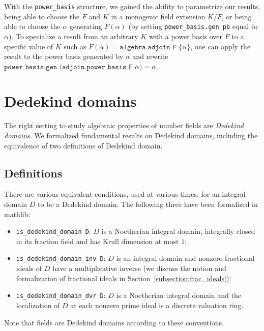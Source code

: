 \documentclass[a4paper,USenglish,cleveref, autoref, thm-restate]{lipics-v2021}
\newcommand{\lean}[1]{\texttt{#1}\xspace} %
\newcommand{\mathlib}{\textsf{mathlib}\xspace}
\begin{document}
With the \lean{power\_basis} structure, we gained the ability to parametrize our results,
being able to choose the $F$ and $K$ in a monogenic field extension $K / F$, or being able to choose the $\alpha$ generating $F(\alpha)$ (by setting \lean{power\_basis.gen\ pb} equal to $\alpha$).
To specialize a result from an arbitrary $K$ with a power basis over $F$ to a specific value of $K$ such as $F(\alpha) = \lean{algebra.adjoin F \{α\}}$,
one can apply the result to the power basis generated by $\alpha$ and rewrite $\lean{power\_basis.gen (adjoin.power\_basis F $\alpha$)} = \alpha$.


\section{Dedekind domains} \label{sec:Dedekind-domain}
The right setting to study algebraic properties of number fields are \emph{Dedekind domains}.
We formalized fundamental results on Dedekind domains, including the equivalence of two definitions of Dedekind domain.

\subsection{Definitions}\label{subsec:definitions_DD}
There are various equivalent conditions, used at various times, for an integral domain $D$ to be a Dedekind domain.
The following three have been formalized in \mathlib:
\begin{itemize}
\item \lean{is\_dedekind\_domain D}: $D$ is a Noetherian integral domain, integrally closed in its fraction field and has Krull dimension at most $1$;
\item \lean{is\_dedekind\_domain\_inv D}: $D$ is an integral domain and nonzero fractional ideals of $D$ have a multiplicative inverse (we discuss the notion and formalization of fractional ideals in Section~\ref{subsection:frac_ideals});
\item \lean{is\_dedekind\_domain\_dvr D}: $D$ is a Noetherian integral domain and the localization of $D$ at each nonzero prime ideal is a discrete valuation ring.
\end{itemize}
Note that fields are Dedekind domains according to these conventions.
\end{document}
